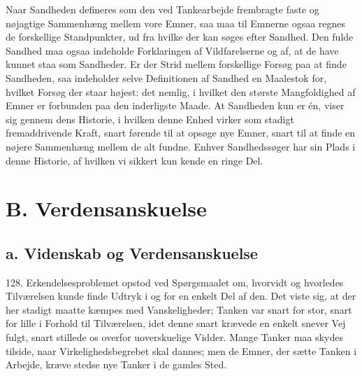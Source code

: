\documentclass[12pt,a4paper]{book}
\newcommand{\opage}[1]{\marginnote{\footnotesize\textit{[#1]}}}
\begin{document}
Naar Sandheden defineres som den ved Tankearbejde frembragte faste og nøjagtige
Sammenhæng mellem vore Emner, saa maa til Emnerne ogsaa regnes de forskellige
Standpunkter, ud fra hvilke der kan søges efter Sandhed. Den fulde Sandhed maa ogsaa
indeholde Forklaringen af Vildfarelserne og af, at de have kunnet staa som Sandheder.
Er der Strid mellem forskellige Forsøg paa at finde Sandheden, saa indeholder selve
Definitionen af Sandhed en Maalestok for, hvilket Forsøg der staar højest: det nemlig,
i hvilket den største Mangfoldighed af Emner er forbunden paa den inderligste Maade.
At Sandheden kun er én, viser sig gennem dens Historie, i hvilken denne Enhed virker som
stadigt fremaddrivende Kraft, snart førende til at opsøge nye Emner, snart til at finde
en nøjere Sammenhæng mellem de alt fundne. Enhver Sandhedssøger har sin Plads i denne
Historie, af hvilken vi sikkert kun kende en ringe Del.

\opage{306} \section*{B. Verdensanskuelse}
\label{sec:verdensanskuelse}

\subsection*{a. Videnskab og Verdensanskuelse}

128. Erkendelsesproblemet opstod ved Spørgsmaalet om, hvorvidt og hvorledes
Tilværelsen kunde finde Udtryk i og for en enkelt Del af den. Det viste sig, at der
her stadigt maatte kæmpes med Vanskeligheder; Tanken var snart for stor, snart for
lille i Forhold til Tilværelsen, idet denne snart krævede en enkelt snever Vej fulgt,
snart stillede os overfor uoverskuelige Vidder. Mange Tanker maa skydes tilside, naar
Virkelighedsbegrebet skal dannes; men de Emner, der sætte Tanken i Arbejde, kræve
stedse nye Tanker i de gamles Sted.
\end{document}
